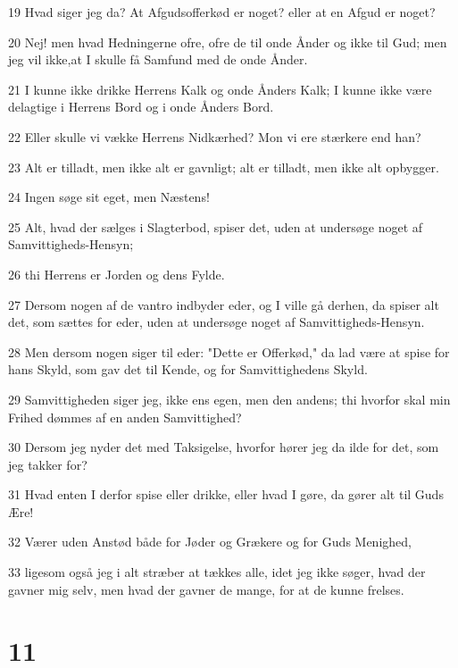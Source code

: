 \par 19 Hvad siger jeg da? At Afgudsofferkød er noget? eller at en Afgud er noget?
\par 20 Nej! men hvad Hedningerne ofre, ofre de til onde Ånder og ikke til Gud; men jeg vil ikke,at I skulle få Samfund med de onde Ånder.
\par 21 I kunne ikke drikke Herrens Kalk og onde Ånders Kalk; I kunne ikke være delagtige i Herrens Bord og i onde Ånders Bord.
\par 22 Eller skulle vi vække Herrens Nidkærhed? Mon vi ere stærkere end han?
\par 23 Alt er tilladt, men ikke alt er gavnligt; alt er tilladt, men ikke alt opbygger.
\par 24 Ingen søge sit eget, men Næstens!
\par 25 Alt, hvad der sælges i Slagterbod, spiser det, uden at undersøge noget af Samvittigheds-Hensyn;
\par 26 thi Herrens er Jorden og dens Fylde.
\par 27 Dersom nogen af de vantro indbyder eder, og I ville gå derhen, da spiser alt det, som sættes for eder, uden at undersøge noget af Samvittigheds-Hensyn.
\par 28 Men dersom nogen siger til eder: "Dette er Offerkød," da lad være at spise for hans Skyld, som gav det til Kende, og for Samvittighedens Skyld.
\par 29 Samvittigheden siger jeg, ikke ens egen, men den andens; thi hvorfor skal min Frihed dømmes af en anden Samvittighed?
\par 30 Dersom jeg nyder det med Taksigelse, hvorfor hører jeg da ilde for det, som jeg takker for?
\par 31 Hvad enten I derfor spise eller drikke, eller hvad I gøre, da gører alt til Guds Ære!
\par 32 Værer uden Anstød både for Jøder og Grækere og for Guds Menighed,
\par 33 ligesom også jeg i alt stræber at tækkes alle, idet jeg ikke søger, hvad der gavner mig selv, men hvad der gavner de mange, for at de kunne frelses.

\chapter{11}

